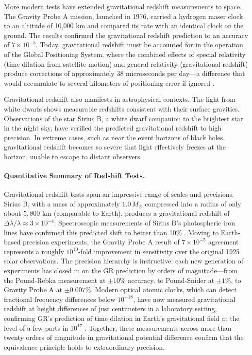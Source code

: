 \documentclass[12pt, a4paper]{article}
\begin{document}
	More modern tests have extended gravitational redshift measurements to space. The Gravity Probe A mission, launched in 1976, carried a hydrogen maser clock to an altitude of 10,000 km and compared its rate with an identical clock on the ground. The results confirmed the gravitational redshift prediction to an accuracy of \(7\times10^{-5}\). Today, gravitational redshift must be accounted for in the operation of the Global Positioning System, where the combined effects of special relativity (time dilation from satellite motion) and general relativity (gravitational redshift) produce corrections of approximately 38 microseconds per day—a difference that would accumulate to several kilometers of positioning error if ignored \citep{ashbyRelativityGlobalPositioning2003}.
	
	Gravitational redshift also manifests in astrophysical contexts. The light from white dwarfs shows measurable redshifts consistent with their surface gravities. Observations of the star Sirius B, a white dwarf companion to the brightest star in the night sky, have verified the predicted gravitational redshift to high precision. In extreme cases, such as near the event horizons of black holes, gravitational redshift becomes so severe that light effectively freezes at the horizon, unable to escape to distant observers.
	
	\paragraph{Quantitative Summary of Redshift Tests.}
	Gravitational redshift tests span an impressive range of scales and precisions. Sirius B, with a mass of approximately $1.0\,M_\odot$ compressed into a radius of only about $5{,}800$ km (comparable to Earth), produces a gravitational redshift of $\Delta\lambda/\lambda \approx 3 \times 10^{-4}$. Spectroscopic measurements of Sirius B's photospheric iron lines have confirmed this predicted shift to better than 10\% \citep{willConfrontationGeneralRelativity2014}. Moving to Earth-based precision experiments, the Gravity Probe A result of $7 \times 10^{-5}$ agreement represents a roughly $10^{10}$-fold improvement in sensitivity over the original 1925 solar observations. The precision hierarchy is instructive: each new generation of experiments has closed in on the GR prediction by orders of magnitude---from the Pound-Rebka measurement at $\pm10\%$ accuracy, to Pound-Snider at $\pm1\%$, to Gravity Probe A at $\pm0.007\%$. Modern optical atomic clocks, which can detect fractional frequency differences below $10^{-18}$, have now measured gravitational redshift at height differences of just centimeters in a laboratory setting, confirming GR's prediction of time dilation in Earth's gravitational field at the level of a few parts in $10^{17}$ \citep{willConfrontationGeneralRelativity2014}. Together, these measurements across more than twenty orders of magnitude in gravitational potential difference confirm that the equivalence principle holds to extraordinary precision.
	
\end{document}
